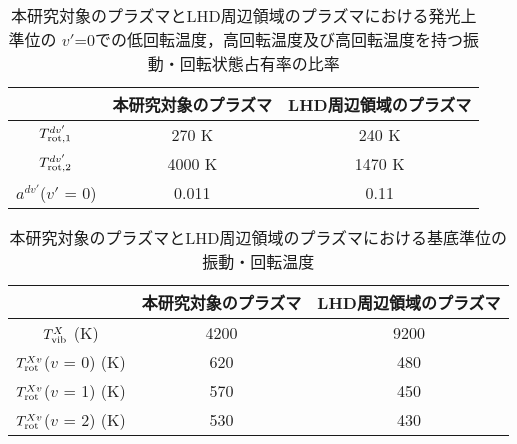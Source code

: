 \begin{table}
    \caption{本研究対象のプラズマとLHD周辺領域のプラズマにおける発光上準位の
    $v'$=0での低回転温度，高回転温度及び高回転温度を持つ振動・回転状態占有率の比率}
    \label{table:two-result-table}
    \centering
    \begin{tabular}{ccc}
        \hline
         & 本研究対象のプラズマ & LHD周辺領域のプラズマ\\
        \hline
        $T^{dv'}_{\rm rot,1}$ & 270 K & 240 K\\
        $T^{dv'}_{\rm rot,2}$ & 4000 K & 1470 K\\
        $a^{dv'}$($v'$ = 0) & 0.011& 0.11\\
        \hline
    \end{tabular}
\end{table}

\begin{table}
    \caption{本研究対象のプラズマとLHD周辺領域のプラズマにおける基底準位の振動・回転温度}
    \label{table:ground-result-compare}
    \centering
    \begin{tabular}{ccc}
        \hline
        & 本研究対象のプラズマ & LHD周辺領域のプラズマ\\
        \hline
        $T^X_{\rm vib}$ (K)& 4200 & 9200\\
        $T^{Xv}_{\rm rot}$($v$ = 0) (K)& 620 & 480\\
        $T^{Xv}_{\rm rot}$($v$ = 1) (K)& 570 & 450\\
        $T^{Xv}_{\rm rot}$($v$ = 2) (K)& 530 & 430\\
        \hline
    \end{tabular}
\end{table}
